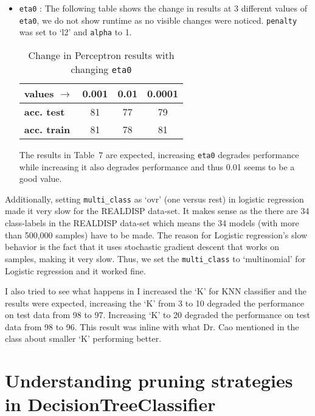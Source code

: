 \documentclass[12pt]{article}
\begin{document}
\begin{itemize}
\begin{itemize}
\item \texttt{eta0} : The following table shows the change in results at 3 different values of \texttt{eta0}, we do not show runtime as no visible changes were noticed. \texttt{penalty} was set to `l2' and \texttt{alpha} to 1.
\begin{table}[!hptb]
\centering
\begin{tabular}{|l|c|c|c|}
\hline
\textbf{values $\to$} & \textbf{0.001} & \textbf{0.01} & \textbf{0.0001} \\\hline
\textbf{acc. test} & 81 & 77 & 79 \\
\textbf{acc. train} & 81 & 78 & 81 \\\hline
\end{tabular}
\caption{Change in Perceptron results with changing \texttt{eta0}}
\end{table}
The results in Table~7 are expected, increasing \texttt{eta0} degrades performance while increasing it also degrades performance and thus 0.01 seems to be a good value.
\end{itemize}
\end{itemize}

Additionally, setting \texttt{multi\_class} as `ovr' (one versus rest) in logistic regression made it very slow for the REALDISP data-set. It makes sense as the there are 34 class-labels in the REALDISP data-set which means the 34 models (with more than 500,000 samples) have to be made. The reason for Logistic regression's slow behavior is the fact that it uses stochastic gradient descent that works on samples, making it very slow. Thus, we set the  \texttt{multi\_class} to `multinomial' for Logistic regression and it worked fine.

I also tried to see what happens in I increased the `K' for KNN classifier and the results were expected, increasing the `K' from 3 to 10 degraded the performance on test data from 98 to 97. Increasing `K' to 20 degraded the performance on test data from 98 to 96. This result was inline with what Dr. Cao mentioned in the class about smaller `K' performing better. 

\section*{Understanding pruning strategies in DecisionTreeClassifier}
\end{document}
